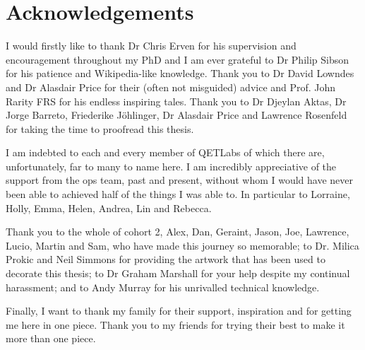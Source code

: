 %
%

\chapter*{Acknowledgements}
I would firstly like to thank Dr Chris Erven for his supervision and encouragement throughout my PhD and I am ever grateful to Dr Philip Sibson for his patience and Wikipedia-like knowledge. Thank you to Dr David Lowndes and Dr Alasdair Price for their (often not misguided) advice and Prof. John Rarity FRS for his endless inspiring tales. Thank you to Dr Djeylan Aktas, Dr Jorge Barreto, Friederike J\"{o}hlinger, Dr Alasdair Price and Lawrence Rosenfeld for taking the time to proofread this thesis.

I am indebted to each and every member of QETLabs of which there are, unfortunately, far to many to name here. 
I am incredibly appreciative of the support from the ops team, past and present, without whom I would have never been able to achieved half of the things I was able to. In particular to Lorraine, Holly, Emma, Helen, Andrea, Lin and Rebecca.

Thank you to the whole of cohort 2, Alex, Dan, Geraint, Jason, Joe, Lawrence, Lucio, Martin and Sam, who have made this journey so memorable; to Dr. Milica Prokic and Neil Simmons for providing the artwork that has been used to decorate this thesis; to Dr Graham Marshall for your help despite my continual harassment; and to Andy Murray for his unrivalled technical knowledge. 

Finally, I want to thank my family for their support, inspiration and for getting me here in one piece. Thank you to my friends for trying their best to make it more than one piece.

\clearpage